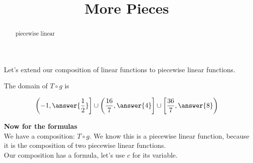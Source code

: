 \documentclass{ximera}
\title{More Pieces}
\begin{document}
\begin{abstract}
piecewise linear
\end{abstract}
\maketitle







Let's extend our composition of linear functions to piecewise linear functions.








The domain of $T \circ g$ is 

\[
\left( -1, \answer{\frac{1}{2}} \right] \cup \left( \frac{16}{7}, \answer{4} \right] \cup \left[ \frac{36}{7}, \answer{8} \right)
\]


\textbf{Now for the formulas} \\


We have a composition: $T \circ g$.  We know this is a piecewise linear function, because it is the composition of two piecewise linear functions. \\

Our composition has a formula, let's use $c$ for its variable. \\
\end{document}
